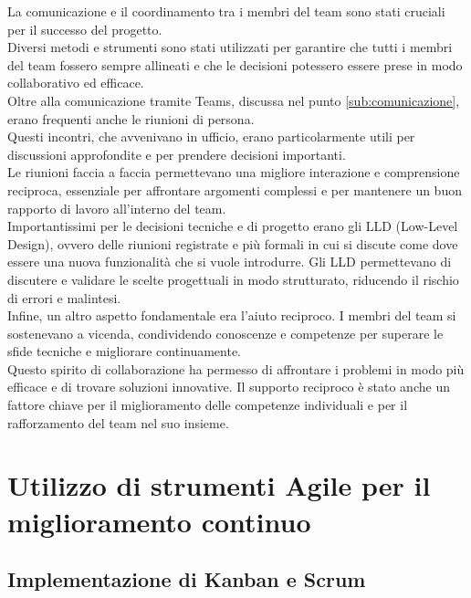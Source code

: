 La comunicazione e il coordinamento tra i membri del team sono stati cruciali per
il successo del progetto.\\ Diversi metodi e strumenti sono stati utilizzati per
garantire che tutti i membri del team fossero sempre allineati e che le decisioni
potessero essere prese in modo collaborativo ed efficace.\\ Oltre alla comunicazione
tramite Teams, discussa nel punto \ref{sub:comunicazione}, erano frequenti anche
le riunioni di persona.\\ Questi incontri, che avvenivano in ufficio, erano particolarmente
utili per discussioni approfondite e per prendere decisioni importanti.\\ Le riunioni
faccia a faccia permettevano una migliore interazione e comprensione reciproca,
essenziale per affrontare argomenti complessi e per mantenere un buon rapporto
di lavoro all'interno del team.\\ Importantissimi per le decisioni tecniche e di
progetto erano gli LLD (Low-Level Design), ovvero delle riunioni registrate e più
formali in cui si discute come dove essere una nuova funzionalità che si vuole introdurre.
Gli LLD permettevano di discutere e validare le scelte progettuali in modo
strutturato, riducendo il rischio di errori e malintesi.\\ Infine, un altro
aspetto fondamentale era l'aiuto reciproco. I membri del team si sostenevano a vicenda,
condividendo conoscenze e competenze per superare le sfide tecniche e migliorare
continuamente.\\ Questo spirito di collaborazione ha permesso di affrontare i
problemi in modo più efficace e di trovare soluzioni innovative. Il supporto reciproco
è stato anche un fattore chiave per il miglioramento delle competenze individuali
e per il rafforzamento del team nel suo insieme.

\section{Utilizzo di strumenti Agile per il miglioramento continuo}
\label{sec:strumenti_agile}

\subsection{Implementazione di Kanban e Scrum}
\label{sub:kanban_scrum}

